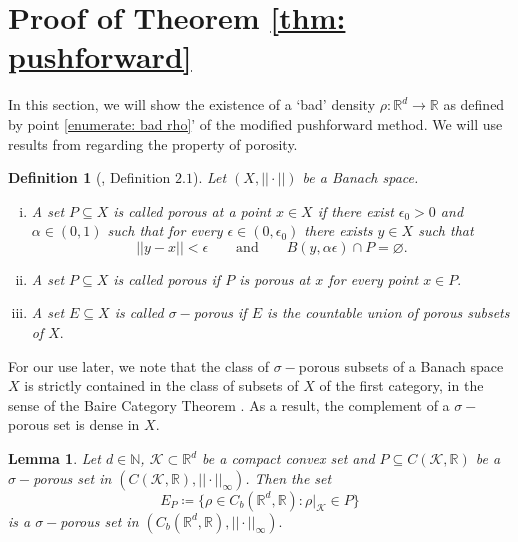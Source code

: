 \documentclass{article}
\newtheorem{define}[thm]{Definition}
\newtheorem{lemma}[define]{Lemma}
\newcommand{\R}{\mathbb{R}}
\newcommand{\N}{\mathbb{N}}
\begin{document}
\section{Proof of Theorem \ref{thm: pushforward}} \label{chapter: 1.11}
In this section, we will show the existence of a `bad' density $\rho:\R^d \to \R$ as defined by point \ref{enumerate: bad rho}' of the modified pushforward method. We will use results from \cite{dymond2018mapping} regarding the property of porosity.
\begin{define}[\cite{article}, Definition $2.1$]
    Let $(X,||\cdot||)$ be a Banach space.
    \begin{enumerate}[(i)]
        \item A set $P \subseteq X$ is called \emph{porous} at a point $x \in X$ if there exist $\epsilon_0>0$ and $\alpha \in (0,1)$ such that for every $\epsilon \in (0, \epsilon_0)$ there exists $y \in X$ such that $$||y-x|| < \epsilon\qquad \text{and} \qquad B(y,\alpha\epsilon) \cap P = \varnothing.$$ 
        \item A set $P \subseteq X$ is called \emph{porous} if $P$ is porous at $x$ for every point $x \in P.$
        \item A set $E \subseteq X$ is called $\sigma-$porous if $E$ is the countable union of porous subsets of $X.$
    \end{enumerate}
\end{define}
For our use later, we note that the class of $\sigma-$porous subsets of a Banach space $X$ is strictly contained in the class of subsets of $X$ of the first category, in the sense of the Baire Category Theorem \cite{article}. As a result, the complement of a $\sigma-$porous set is dense in $X.$
\begin{lemma} \label{lemma: existence of bad rho}
    Let $d \in \N$, $\mathcal{K} \subset \R^d$ be a compact convex set and $P \subseteq C(\mathcal{K},\R)$ be a $\sigma-$porous set in $(C(\mathcal{K},\R),||\cdot||_{\infty})$. Then the set 
    \begin{equation*}
        E_P \coloneqq \{\rho \in C_b(\R^d,\R): \rho|_{\mathcal{K}} \in P\} 
    \end{equation*} is a $\sigma-$porous set in $(C_b(\R^d,\R),||\cdot||_{\infty}).$ 
\end{lemma}
\end{document}

